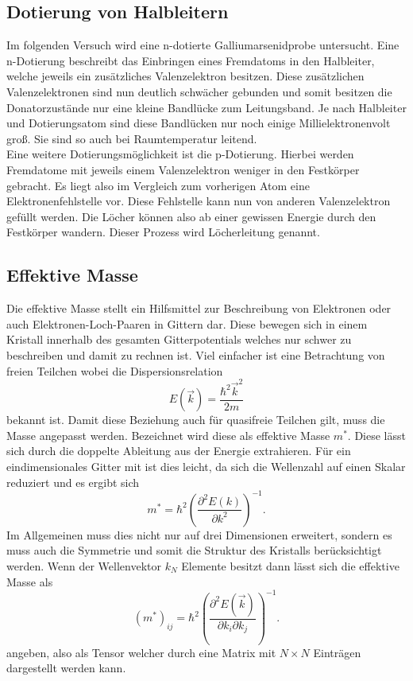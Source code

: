 \subsection{Dotierung von Halbleitern}
Im folgenden Versuch wird eine n-dotierte 
Galliumarsenidprobe untersucht. Eine n-Dotierung beschreibt das Einbringen eines Fremdatoms in den Halbleiter, welche jeweils ein zusätzliches Valenzelektron besitzen. Diese
zusätzlichen Valenzelektronen sind nun deutlich schwächer gebunden und somit besitzen die Donatorzustände nur eine kleine Bandlücke zum Leitungsband. Je nach Halbleiter und Dotierungsatom sind
diese Bandlücken nur noch einige Millielektronenvolt groß. Sie sind so auch bei Raumtemperatur leitend.
\\
Eine weitere Dotierungsmöglichkeit ist die p-Dotierung. Hierbei werden Fremdatome mit jeweils einem Valenzelektron weniger in den Festkörper gebracht. Es liegt also im Vergleich zum vorherigen Atom eine Elektronenfehlstelle vor. 
Diese Fehlstelle kann nun von anderen Valenzelektron gefüllt werden. Die Löcher können also ab einer gewissen Energie durch den Festkörper wandern. Dieser Prozess wird Löcherleitung genannt.

\subsection{Effektive Masse}

Die effektive Masse stellt ein Hilfsmittel zur Beschreibung von Elektronen oder auch Elektronen-Loch-Paaren in Gittern dar. Diese bewegen sich in einem Kristall
innerhalb des gesamten Gitterpotentials welches nur schwer zu beschreiben und damit zu rechnen ist. Viel einfacher ist eine Betrachtung von freien Teilchen wobei
die Dispersionsrelation
\begin{equation*}
E(\vec{k}) = \frac{\hbar^2 \vec{k}^2}{2m}
\end{equation*}
bekannt ist. Damit diese Beziehung auch für quasifreie Teilchen gilt, muss die Masse angepasst werden. Bezeichnet wird diese
als effektive Masse $m^*$. Diese lässt sich durch die doppelte Ableitung aus der Energie extrahieren. Für ein eindimensionales Gitter mit ist dies leicht, da
sich die Wellenzahl auf einen Skalar reduziert und es ergibt sich
\begin{equation*}
m^* = \hbar^2 \left( \frac{\partial^2 E(k)}{\partial k^2} \right)^{-1}.
\end{equation*}
Im Allgemeinen muss dies nicht nur auf drei Dimensionen erweitert, sondern es muss auch die Symmetrie und somit die Struktur des Kristalls berücksichtigt werden.
Wenn der Wellenvektor $k_N$ Elemente besitzt dann lässt sich die effektive Masse als 
\begin{equation*}
    (m^*)_{ij} = \hbar^2 \left( \frac{\partial^2 E(\vec{k})}{\partial k_i \partial k_j} \right)^{-1}. 
\end{equation*}
angeben, also als Tensor welcher durch eine Matrix mit $N \times N$ Einträgen dargestellt werden kann.

